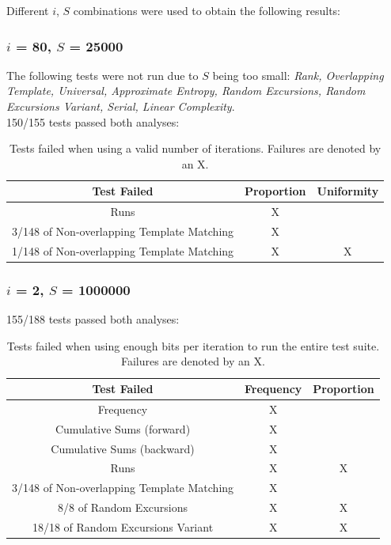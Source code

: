 \documentclass[12pt]{article}
\begin{document}
    Different $i$, $S$ combinations were used to obtain the following results:

    \subsubsection{$i$ = 80, $S$ = 25000}
      The following tests were not run due to $S$ being too small: \textit{Rank, Overlapping Template, Universal, Approximate Entropy, Random Excursions, Random Excursions Variant, Serial, Linear Complexity}.\\

      150/155 tests passed both analyses:
      \begin{table}[H]
        \centering
        \begin{tabular}{|c||c|c|}
          \hline
          Test Failed & Proportion & Uniformity\\
          \hline
          \hline
          Runs & X & \\
          \hline
          3/148 of Non-overlapping Template Matching & X & \\
          \hline
          1/148 of Non-overlapping Template Matching & X & X\\
          \hline
        \end{tabular}
        \caption{Tests failed when using a valid number of iterations. Failures are denoted by an X. }
        \label{table:nist_80}
      \end{table}

      \subsubsection{$i$ = 2, $S$ = 1000000}
        155/188 tests passed both analyses:
        \begin{table}[H]
          \centering
          \begin{tabular}{|c||c|c|}
            \hline
            Test Failed & Frequency & Proportion\\
            \hline
            \hline
            Frequency & X & \\
            \hline
            Cumulative Sums (forward) & X & \\
            \hline
            Cumulative Sums (backward) & X & \\
            \hline
            Runs & X & X\\
            \hline
            3/148 of Non-overlapping Template Matching & X & \\
            \hline
            8/8 of Random Excursions & X & X\\
            \hline
            18/18 of Random Excursions Variant & X & X\\
            \hline
          \end{tabular}
          \caption{Tests failed when using enough bits per iteration to run the entire test suite. Failures are denoted by an X.}
          \label{table:nist_2}
        \end{table}
\end{document}
